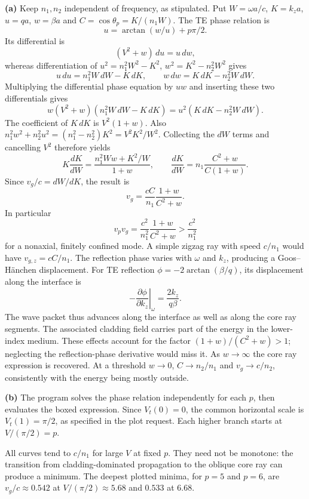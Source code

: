 \medskip\noindent\textbf{(a)} Keep $n_1,n_2$ independent of frequency, as stipulated.  Put
$W=\omega a/c$, $K=k_za$, $u=qa$, $w=\beta a$ and
$C=\cos\theta_p=K/(n_1W)$.  The TE phase relation is
\[
u=\arctan(w/u)+p\pi/2.
\]
Its differential is
\[
(V^2+w)\,du=u\,dw,
\]
whereas differentiation of
$u^2=n_1^2W^2-K^2$, $w^2=K^2-n_2^2W^2$ gives
\[
u\,du=n_1^2W\,dW-K\,dK,\qquad
w\,dw=K\,dK-n_2^2W\,dW.
\]
Multiplying the differential phase equation by $uw$ and inserting
these two differentials gives
\[
w(V^2+w)(n_1^2W\,dW-K\,dK)
=u^2(K\,dK-n_2^2W\,dW).
\]
The coefficient of $K\,dK$ is $V^2(1+w)$.
Also $n_1^2w^2+n_2^2u^2=(n_1^2-n_2^2)K^2=V^2K^2/W^2$.
Collecting the $dW$ terms and cancelling $V^2$ therefore yields
\[
K\frac{dK}{dW}=\frac{n_1^2Ww+K^2/W}{1+w},\qquad
\frac{dK}{dW}=n_1\frac{C^2+w}{C(1+w)}.
\]
Since $v_g/c=dW/dK$, the result is
\[
\boxed{v_g=\frac{cC}{n_1}\frac{1+w}{C^2+w}.}
\]
In particular
\[
v_pv_g=\frac{c^2}{n_1^2}\frac{1+w}{C^2+w}
>\frac{c^2}{n_1^2}
\]
for a nonaxial, finitely confined mode.  A simple zigzag ray with
speed $c/n_1$ would have $v_{g,z}=cC/n_1$.
The reflection phase varies with $\omega$ and $k_z$, producing a
Goos--H\"anchen displacement.  For TE reflection
$\phi=-2\arctan(\beta/q)$, its displacement along the interface is
\[
-\left.\frac{\partial\phi}{\partial k_z}\right|_\omega
=\frac{2k_z}{q\beta}.
\]
The wave packet thus advances along the interface as well as along
the core ray segments.  The associated cladding field carries part
of the energy in the lower-index medium.  These effects account
for the factor $(1+w)/(C^2+w)>1$; neglecting the reflection-phase
derivative would miss it.  As $w\to\infty$ the core ray expression
is recovered.  At a threshold $w\to0$, $C\to n_2/n_1$ and
$v_g\to c/n_2$, consistently with the energy being mostly outside.

\medskip\noindent\textbf{(b)} The program solves the phase relation independently for each $p$,
then evaluates the boxed expression.  Since $V_t(0)=0$, the common
horizontal scale is $V_t(1)=\pi/2$, as specified in the plot request.
Each higher branch starts at $V/(\pi/2)=p$.
\begin{center}\end{center}
All curves tend to $c/n_1$ for large $V$ at fixed $p$.  They need
not be monotone: the transition from cladding-dominated propagation
to the oblique core ray can produce a minimum.  The deepest plotted
minima, for $p=5$ and $p=6$, are $v_g/c\approx0.542$ at
$V/(\pi/2)\approx5.68$ and $0.533$ at $6.68$.

